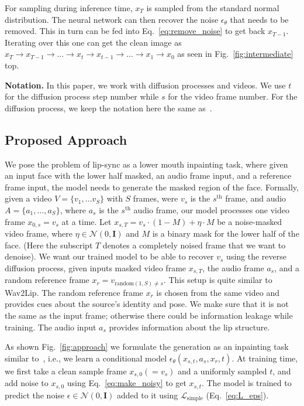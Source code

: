 For sampling during inference time, $x_T$ is sampled from the standard normal distribution. The neural network can then recover the noise $\epsilon_\theta$ that needs to be removed. This in turn can be fed into Eq.~\ref{eq:remove_noise} to get back $x_{T-1}$. Iterating over this one can get the clean image as $x_T\rightarrow x_{T-1} \rightarrow \dots \rightarrow  x_t\rightarrow x_{t-1} \rightarrow \dots \rightarrow x_1\rightarrow x_0$ as seen in Fig.~\ref{fig:intermediate} top.

 

\textbf{Notation.} In this paper, we work with diffusion processes and videos. We use $t$ for the diffusion process step number while $s$ for the video frame number.  For the diffusion process, we keep the notation here the same as~\cite{improved-diffusion}.

\subsection{Proposed Approach}\label{sec:approach}


We pose the problem of lip-sync as a lower mouth inpainting task,  where given an input face with the lower half masked, an audio frame input, and a reference frame input, the model needs to generate the masked region of the face. Formally, given a video $V=\{v_1,\dots v_S\}$ with $S$ frames, were $v_s$ is the $s^\text{th}$ frame, and audio $A=\{a_1,\dots, a_S\}$, where $a_s$ is the $s^\text{th}$ audio frame, our model processes one video frame $x_{0,s}=v_s$ at a time. Let $x_{s,T}=v_s\cdot (1-M) + \eta \cdot M$ be a noise-masked video frame, where $\eta \in \mathcal{N}(0, \textbf{I})$ and $M$ is a binary mask for the lower half of the face. (Here the subscript $T$ denotes a completely noised frame that we want to denoise). We want our trained model to be able to recover $v_s$ using the reverse diffusion process, given inputs masked video frame $x_{s,T}$, the audio frame $a_s$, and a random reference frame $x_r=v_{\text{random}(1,S)\neq s}$. This setup is quite similar to Wav2Lip\cite{wav2lip}. The random reference frame $x_r$ is chosen from the same video and provides cues about the source's identity and pose. We make sure that it is not the same as the input frame; otherwise there could be information leakage while training. The audio input $a_s$ provides information about the lip structure.  

As shown Fig.~\ref{fig:approach} we formulate the generation as an inpainting task similar to~\cite{palette}, i.e.,  we learn a conditional model $\epsilon_\theta(x_{s,t}, a_s, x_r,t)$. At training time, we first take a clean sample frame $x_{s,0}(=v_s)$ and a uniformly sampled $t$, and add noise to $x_{s,0}$ using Eq.~\ref{eq:make_noisy} to get $x_{s,t}$. The model is trained to predict the noise $\epsilon  \in \mathcal{N}(0, \textbf{I})$ added to it using $\mathcal{L}_{\text{simple}}$ (Eq.~\ref{eq:L_eps}).


